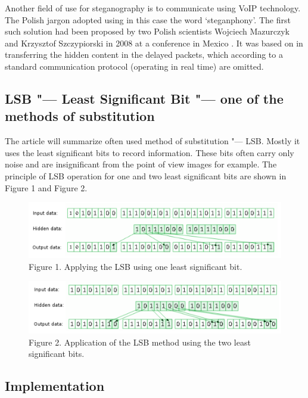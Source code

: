 \documentclass[10pt, a5paper]{article}
\begin{document}
Another field of use for steganography is to communicate using VoIP technology. The Polish jargon adopted using in this case the word ‘steganphony’. The first such solution had been proposed by two Polish scientists Wojciech Mazurczyk and Krzysztof Szczypiorski in 2008 at a conference in Mexico \footnotemark[11]. It was based on in transferring the hidden content in the delayed packets, which according to a standard communication protocol (operating in real time) are omitted.

\subsection*{LSB "--- Least Significant Bit "--- one of the methods of substitution}

The article will summarize often used method of substitution "--- LSB. Mostly it uses the least significant bits to record information. These bits often carry only noise and are insignificant from the point of view images for example. The principle of LSB operation for one and two least significant bits are shown in Figure 1 and Figure 2.

\begin{figure}[h!]
  \centering
  \includegraphics[width=\textwidth]{103_2014_w_Kwiatkowska_lsb1.png}
  Figure 1. Applying the LSB using one least significant bit.
\end{figure}

\begin{figure}[h!]
  \centering
  \includegraphics[width=\textwidth]{103_2014_w_Kwiatkowska_lsb2.png}
  Figure 2. Application of the LSB method using the two least significant bits.
\end{figure}

\subsection*{Implementation}
\end{document}
